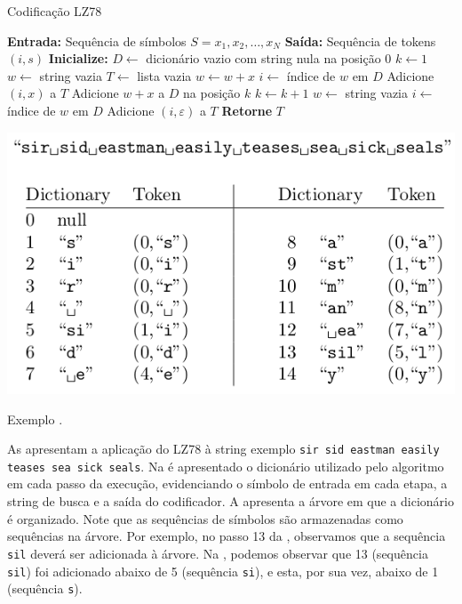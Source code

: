 \begin{algorithm}
\caption{Codificação LZ78}
\label{alg:lz78}
\begin{algorithmic}[1]
\State \textbf{Entrada:} Sequência de símbolos \( S = x_1, x_2, \dots, x_N \)
\State \textbf{Saída:} Sequência de tokens \( (i, s) \)
\State \textbf{Inicialize:}
\State \quad \( D \gets \) dicionário vazio com string nula na posição 0
\State \quad \( k \gets 1 \) 
\State \quad \( w \gets \) string vazia 
\State \quad \( T \gets \) lista vazia 
        \State \( w \gets w + x \)
    \Else
        \State \( i \gets \) índice de \( w \) em \( D \)
        \State Adicione \( (i, x) \) a \( T \)
        \State Adicione \( w + x \) a \( D \) na posição \( k \)
        \State \( k \gets k + 1 \)
        \State \( w \gets \) string vazia
    \EndIf
\EndFor
{}
    \State \( i \gets \) índice de \( w \) em \( D \)
    \State Adicione \( (i, \varepsilon) \) a \( T \)
\EndIf
\State \textbf{Retorne} \( T \)
\end{algorithmic}
\end{algorithm}

\begin{marginfigure}
\centering
\includegraphics[width=\linewidth]{figures/lz78_example.png}
\caption{Exemplo \parencite{salomon2007}.}\label{fig:lz78_example}
\end{marginfigure}

As  apresentam a aplicação do LZ78
à string exemplo \texttt{sir sid eastman easily teases sea sick seals}.
Na  é apresentado o dicionário utilizado pelo
algoritmo em cada passo da execução, evidenciando o símbolo de entrada
em cada etapa, a string de busca e a saída do codificador.
A  apresenta a árvore em que a dicionário
é organizado. Note que as sequências de símbolos são armazenadas como
sequências na árvore. Por exemplo, no passo 13 da ,
observamos que a sequência \texttt{sil} deverá ser adicionada à árvore.
Na , podemos observar que 13 (sequência \texttt{sil})
foi adicionado abaixo de 5 (sequência \texttt{si}), e esta, por sua vez, abaixo 
de 1 (sequência \texttt{s}).

